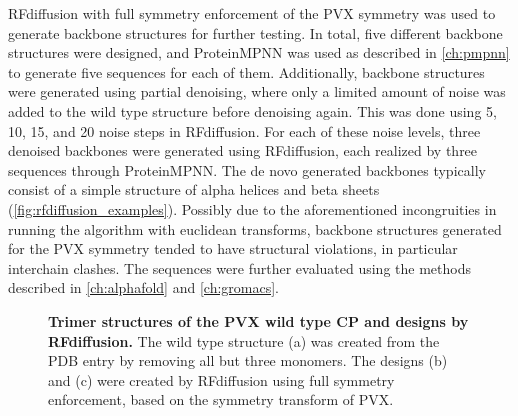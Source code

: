 \FloatBarrier

RFdiffusion with full symmetry enforcement of the PVX symmetry was used to generate backbone structures for further testing. In total, five different backbone structures were designed, and ProteinMPNN was used as described in \autoref{ch:pmpnn} to generate five sequences for each of them. Additionally, backbone structures were generated using partial denoising, where only a limited amount of noise was added to the wild type structure before denoising again. This was done using 5, 10, 15, and 20 noise steps in RFdiffusion. For each of these noise levels, three denoised backbones were generated using RFdiffusion, each realized by three sequences through ProteinMPNN. The de novo generated backbones typically consist of a simple structure of alpha helices and beta sheets (\autoref{fig:rfdiffusion_examples}). Possibly due to the aforementioned incongruities in running the algorithm with euclidean transforms, backbone structures generated for the PVX symmetry tended to have structural violations, in particular interchain clashes. The sequences were further evaluated using the methods described in \autoref{ch:alphafold} and \autoref{ch:gromacs}.


\begin{figure}
\centering

\caption{\textbf{Trimer structures of the PVX wild type CP and designs by RFdiffusion. } The wild type structure (a) was created from the PDB entry by removing all but three monomers. The designs (b) and (c) were created by RFdiffusion using full symmetry enforcement, based on the symmetry transform of PVX. }
\label{fig:rfdiffusion_examples}
\end{figure}

